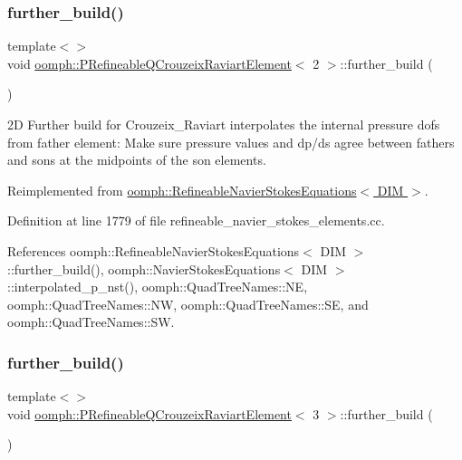 \subsubsection{\texorpdfstring{further\+\_\+build()}{further\_build()}\hspace{0.1cm}{\footnotesize\ttfamily [2/3]}}
{\footnotesize\ttfamily template$<$$>$ \\
void \hyperlink{classoomph_1_1PRefineableQCrouzeixRaviartElement}{oomph\+::\+P\+Refineable\+Q\+Crouzeix\+Raviart\+Element}$<$ 2 $>$\+::further\+\_\+build (\begin{DoxyParamCaption}{ }\end{DoxyParamCaption})\hspace{0.3cm}{\ttfamily [virtual]}}

2D Further build for Crouzeix\+\_\+\+Raviart interpolates the internal pressure dofs from father element\+: Make sure pressure values and dp/ds agree between fathers and sons at the midpoints of the son elements. 

Reimplemented from \hyperlink{classoomph_1_1RefineableNavierStokesEquations_a7afd6250585ea597c3df65b8c7744da4}{oomph\+::\+Refineable\+Navier\+Stokes\+Equations$<$ D\+I\+M $>$}.



Definition at line 1779 of file refineable\+\_\+navier\+\_\+stokes\+\_\+elements.\+cc.



References oomph\+::\+Refineable\+Navier\+Stokes\+Equations$<$ D\+I\+M $>$\+::further\+\_\+build(), oomph\+::\+Navier\+Stokes\+Equations$<$ D\+I\+M $>$\+::interpolated\+\_\+p\+\_\+nst(), oomph\+::\+Quad\+Tree\+Names\+::\+NE, oomph\+::\+Quad\+Tree\+Names\+::\+NW, oomph\+::\+Quad\+Tree\+Names\+::\+SE, and oomph\+::\+Quad\+Tree\+Names\+::\+SW.

\mbox{\label{classoomph_1_1PRefineableQCrouzeixRaviartElement_a4d5c10a7a11d43c4af08196b95e4803e}} 
\subsubsection{\texorpdfstring{further\+\_\+build()}{further\_build()}\hspace{0.1cm}{\footnotesize\ttfamily [3/3]}}
{\footnotesize\ttfamily template$<$$>$ \\
void \hyperlink{classoomph_1_1PRefineableQCrouzeixRaviartElement}{oomph\+::\+P\+Refineable\+Q\+Crouzeix\+Raviart\+Element}$<$ 3 $>$\+::further\+\_\+build (\begin{DoxyParamCaption}{ }\end{DoxyParamCaption})\hspace{0.3cm}{\ttfamily [virtual]}}


